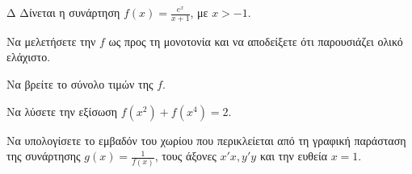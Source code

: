 \begin{thema}{Δ}
Δίνεται η συνάρτηση $\displaystyle f(x) = \frac{e^x}{x+1}$, με $x > -1$.
\begin{erwthma}
    \item Να μελετήσετε την $f$ ως προς τη μονοτονία και να αποδείξετε ότι παρουσιάζει ολικό ελάχιστο.
    \item Να βρείτε το σύνολο τιμών της $f$.
    \item Να λύσετε την εξίσωση $f(x^2) + f(x^4) = 2$.
    \item Να υπολογίσετε το εμβαδόν του χωρίου που περικλείεται από τη γραφική παράσταση της συνάρτησης $\displaystyle g(x) = \frac{1}{f(x)}$, τους άξονες $x'x, y'y$ και την ευθεία $x=1$.
\end{erwthma}
\end{thema}

